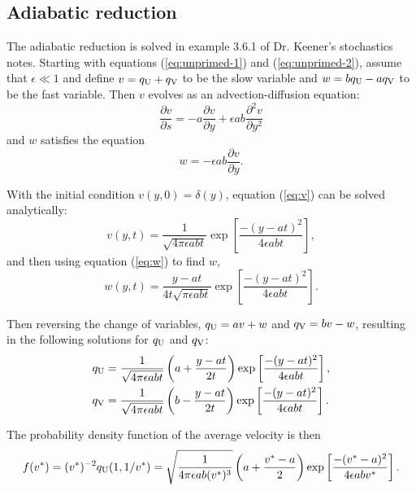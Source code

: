 \documentclass{article}
\newcommand{\tn}{\textnormal}
\newcommand{\Pder}[2]{\frac{\partial #1}{\partial #2}}
\begin{document}
\subsection{Adiabatic reduction}
\label{sec:adb-red}

The adiabatic reduction is solved in example 3.6.1 of Dr. Keener's
stochastics notes. Starting with equations (\ref{eq:unprimed-1}) and
(\ref{eq:unprimed-2}), assume that $\epsilon \ll 1$ and define $v =
q_\tn{U} + q_\tn{V}$ to be the slow variable and $w = b q_\tn{U} - a
q_\tn{V}$ to be the fast variable. Then $v$ evolves as an
advection-diffusion equation:
\begin{equation}
  \label{eq:v}
  \Pder{v}{s} = -a \Pder{v}{y} + \epsilon a b \frac{\partial^2
    v}{\partial y^2}
\end{equation}
and $w$ satisfies the equation
\begin{equation}
  \label{eq:w}
  w = -\epsilon a b \Pder{v}{y}.
\end{equation}

With the initial condition $v(y, 0) = \delta(y)$, equation
(\ref{eq:v}) can be solved analytically:
\begin{equation}
  \label{eq:v-soln}
  v(y, t) = \frac{1}{\sqrt{4 \pi \epsilon a b t}} \exp \left[ \frac{-(y
      - at)^2}{4 \epsilon a b t} \right],
\end{equation}
and then using equation (\ref{eq:w}) to find $w$,
\begin{equation}
  \label{eq:w-soln}
  w(y, t) = \frac{y - at}{4t\sqrt{\pi \epsilon a b t}} \exp \left[ \frac{-(y
      - at)^2}{4 \epsilon a b t} \right].
\end{equation}

Then reversing the change of variables, $q_\tn{U} = av + w$ and
$q_\tn{V} = bv - w$, resulting in the following solutions for
$q_\tn{U}$ and $q_\tn{V}$:
\begin{align}
  \label{eq:qu-soln}
  q_\tn{U} &= \frac{1}{\sqrt{4 \pi \epsilon a b t}} \left(a + \frac{y
             - at}{2t} \right) \exp \left[ \frac{-(y - at)^2}{4
             \epsilon a b t} \right], \\
  \label{eq:qv-soln}
  q_\tn{V} &= \frac{1}{\sqrt{4 \pi \epsilon a b t}} \left(b - \frac{y
             - at}{2t} \right) \exp \left[ \frac{-(y - at)^2}{4
             \epsilon a b t} \right].
\end{align}

The probability density function of the average velocity is then
\begin{equation}
  \label{eq:vel-dens}
  f(v^*) = (v^*)^{-2} q_\tn{U}(1, 1/v^*) = \sqrt{\frac{1}{4 \pi
      \epsilon a b (v^*)^3}}
  \left(a + \frac{v^* - a}{2} \right) \exp\left[ \frac{-(v^* -
      a)^2}{4\epsilon a b v^*} \right].
\end{equation}





\end{document}

